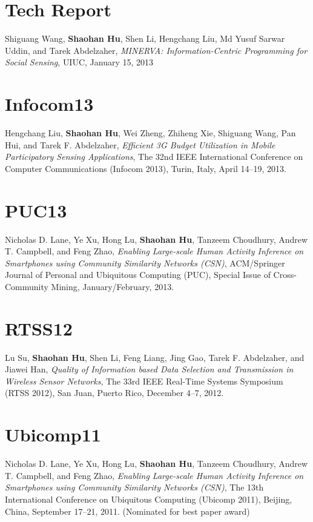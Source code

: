 \section{\sc Tech Report}
Shiguang Wang, \textbf{Shaohan Hu}, Shen Li, Hengchang Liu, Md Yusuf
Sarwar Uddin, and Tarek Abdelzaher, \emph{MINERVA: Information-Centric
  Programming for Social Sensing}, \textsf{UIUC}, January 15, 2013

\section{\sc Infocom13}
Hengchang Liu, \textbf{Shaohan Hu}, Wei Zheng, Zhiheng Xie, Shiguang
Wang, Pan Hui, and Tarek F. Abdelzaher, \emph{Efficient 3G Budget
  Utilization in Mobile Participatory Sensing Applications},
\textsf{The 32nd IEEE International Conference on Computer
  Communications (Infocom 2013)}, Turin, Italy, April 14--19, 2013.

\section{\sc PUC13}
Nicholas D. Lane, Ye Xu, Hong Lu, \textbf{Shaohan Hu}, Tanzeem
Choudhury, Andrew T. Campbell, and Feng Zhao, \emph{Enabling
  Large-scale Human Activity Inference on Smartphones using Community
  Similarity Networks (CSN)}, \textsf{ACM/Springer Journal of Personal
  and Ubiquitous Computing (PUC), Special Issue of Cross-Community
  Mining}, January/February, 2013.

\section{\sc RTSS12}
Lu Su, \textbf{Shaohan Hu}, Shen Li, Feng Liang, Jing Gao, Tarek
F. Abdelzaher, and Jiawei Han, \emph{Quality of Information based Data
  Selection and Transmission in Wireless Sensor Networks}, \textsf{The
  33rd IEEE Real-Time Systems Symposium (RTSS 2012)}, San Juan, Puerto
Rico, December 4--7, 2012.

\section{\sc Ubicomp11}
Nicholas D. Lane, Ye Xu, Hong Lu, \textbf{Shaohan Hu}, Tanzeem
Choudhury, Andrew T. Campbell, and Feng Zhao, \emph{Enabling
  Large-scale Human Activity Inference on Smartphones using Community
  Similarity Networks (CSN)}, \textsf{The 13th International
  Conference on Ubiquitous Computing (Ubicomp 2011)}, Beijing, China,
September 17--21, 2011. (Nominated for best paper award)

